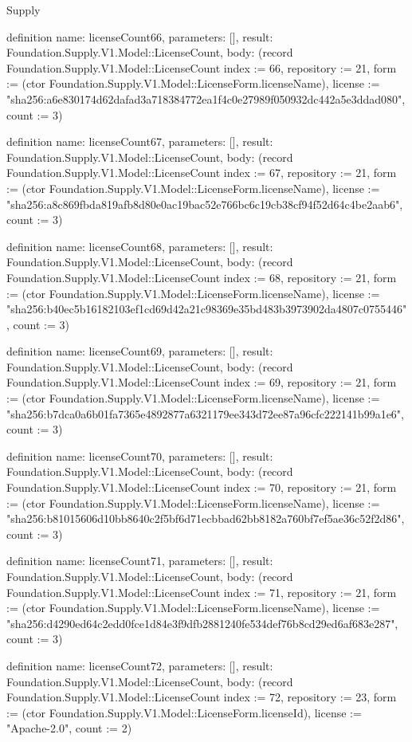 \begin{lexlean}{Supply}
\begin{semanticmodule}
definition{
  name: licenseCount66,
  parameters: [],
  result: Foundation.Supply.V1.Model::LicenseCount,
  body: (record Foundation.Supply.V1.Model::LicenseCount {index := 66, repository := 21, form := (ctor Foundation.Supply.V1.Model::LicenseForm.licenseName), license := "sha256:a6e830174d62dafad3a718384772ea1f4c0e27989f050932dc442a5e3ddad080", count := 3})
}

definition{
  name: licenseCount67,
  parameters: [],
  result: Foundation.Supply.V1.Model::LicenseCount,
  body: (record Foundation.Supply.V1.Model::LicenseCount {index := 67, repository := 21, form := (ctor Foundation.Supply.V1.Model::LicenseForm.licenseName), license := "sha256:a8c869fbda819afb8d80e0ac19bac52e766bc6c19cb38cf94f52d64c4be2aab6", count := 3})
}

definition{
  name: licenseCount68,
  parameters: [],
  result: Foundation.Supply.V1.Model::LicenseCount,
  body: (record Foundation.Supply.V1.Model::LicenseCount {index := 68, repository := 21, form := (ctor Foundation.Supply.V1.Model::LicenseForm.licenseName), license := "sha256:b40ec5b16182103ef1cd69d42a21c98369e35bd483b3973902da4807c0755446", count := 3})
}

definition{
  name: licenseCount69,
  parameters: [],
  result: Foundation.Supply.V1.Model::LicenseCount,
  body: (record Foundation.Supply.V1.Model::LicenseCount {index := 69, repository := 21, form := (ctor Foundation.Supply.V1.Model::LicenseForm.licenseName), license := "sha256:b7dca0a6b01fa7365e4892877a6321179ee343d72ee87a96cfc222141b99a1e6", count := 3})
}

definition{
  name: licenseCount70,
  parameters: [],
  result: Foundation.Supply.V1.Model::LicenseCount,
  body: (record Foundation.Supply.V1.Model::LicenseCount {index := 70, repository := 21, form := (ctor Foundation.Supply.V1.Model::LicenseForm.licenseName), license := "sha256:b81015606d10bb8640c2f5bf6d71ecbbad62bb8182a760bf7ef5ae36c52f2d86", count := 3})
}

definition{
  name: licenseCount71,
  parameters: [],
  result: Foundation.Supply.V1.Model::LicenseCount,
  body: (record Foundation.Supply.V1.Model::LicenseCount {index := 71, repository := 21, form := (ctor Foundation.Supply.V1.Model::LicenseForm.licenseName), license := "sha256:d4290ed64c2edd0fce1d84e3f9dfb2881240fe534def76b8cd29ed6af683e287", count := 3})
}

definition{
  name: licenseCount72,
  parameters: [],
  result: Foundation.Supply.V1.Model::LicenseCount,
  body: (record Foundation.Supply.V1.Model::LicenseCount {index := 72, repository := 23, form := (ctor Foundation.Supply.V1.Model::LicenseForm.licenseId), license := "Apache-2.0", count := 2})
}


\end{semanticmodule}
\end{lexlean}
